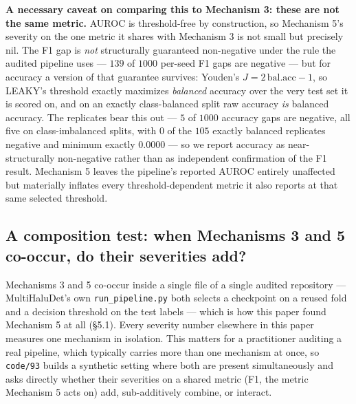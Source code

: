 \documentclass[10pt]{article} %
\begin{document}
\textbf{A necessary caveat on comparing this to Mechanism 3: these are not the
same metric.} AUROC is threshold-free by construction, so Mechanism 5's
severity on the one metric it shares with Mechanism 3 is not small but
precisely nil. The F1 gap is \emph{not} structurally guaranteed non-negative
under the rule the audited pipeline uses --- $139$ of $1000$ per-seed F1 gaps
are negative --- but for accuracy a version of that guarantee survives: Youden's
$J=2\,\text{bal.acc}-1$, so LEAKY's threshold exactly maximizes \emph{balanced}
accuracy over the very test set it is scored on, and on an exactly
class-balanced split raw accuracy \emph{is} balanced accuracy. The replicates
bear this out --- $5$ of $1000$ accuracy gaps are negative, all five on
class-imbalanced splits, with $0$ of the $105$ exactly balanced replicates
negative and minimum exactly $0.0000$ --- so we report accuracy as
near-structurally non-negative rather than as independent confirmation of the
F1 result. Mechanism 5 leaves the pipeline's reported AUROC entirely unaffected
but materially inflates every threshold-dependent metric it also reports at
that same selected threshold.

\subsection{A composition test: when Mechanisms 3 and 5 co-occur, do their severities add?}
\label{sec:composition}

Mechanisms 3 and 5 co-occur inside a single file of a single audited
repository --- MultiHaluDet's own \texttt{run\_pipeline.py} both selects a
checkpoint on a reused fold and a decision threshold on the test labels ---
which is how this paper found Mechanism 5 at all (\S5.1). Every severity
number elsewhere in this paper measures one mechanism in isolation. This
matters for a practitioner auditing a real pipeline, which typically carries
more than one mechanism at once, so \texttt{code/93} builds a synthetic
setting where both are present simultaneously and asks directly whether their
severities on a shared metric (F1, the metric Mechanism 5 acts on) add,
sub-additively combine, or interact.
\end{document}
